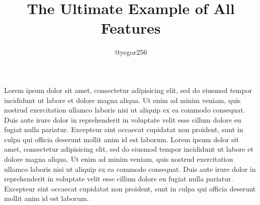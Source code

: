 \documentclass{article}
\title{The Ultimate Example of All Features}
\author{@yegor256}
\begin{document}

\pptToc[Agenda]









\begin{pptWide}{3}
Lorem ipsum dolor sit amet, consectetur adipisicing elit, sed do eiusmod
tempor incididunt ut labore et dolore magna aliqua. Ut enim ad minim veniam,
quis nostrud exercitation ullamco laboris nisi ut aliquip ex ea commodo
consequat. Duis aute irure dolor in reprehenderit in voluptate velit esse
cillum dolore eu fugiat nulla pariatur. Excepteur sint occaecat cupidatat non
proident, sunt in culpa qui officia deserunt mollit anim id est laborum.
Lorem ipsum dolor sit amet, consectetur adipisicing elit, sed do eiusmod
tempor incididunt ut labore et dolore magna aliqua. Ut enim ad minim veniam,
quis nostrud exercitation ullamco laboris nisi ut aliquip ex ea commodo
consequat. Duis aute irure dolor in reprehenderit in voluptate velit esse
cillum dolore eu fugiat nulla pariatur. Excepteur sint occaecat cupidatat non
proident, sunt in culpa qui officia deserunt mollit anim id est laborum.
\end{pptWide}
\end{document}
